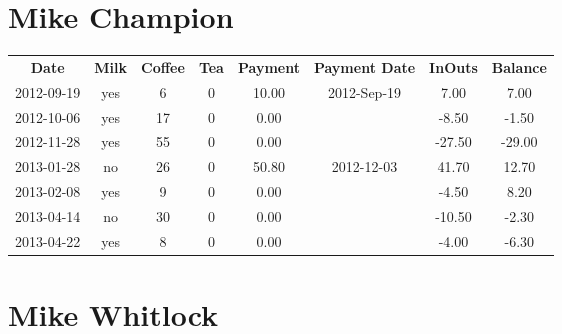 \section{Mike Champion}

\begin{center}
\begin{tabular}{cccccccc}
\textbf{Date} & \textbf{Milk} & \textbf{Coffee} & \textbf{Tea} & \textbf{Payment} & \textbf{Payment Date} & \textbf{InOuts} & \textbf{Balance} \\
2012-09-19 & yes &  6 & 0 & 10.00 & 2012-Sep-19 &   7.00 &   7.00\\ 
2012-10-06 & yes & 17 & 0 &  0.00 &  &  -8.50 &  -1.50\\ 
2012-11-28 & yes & 55 & 0 &  0.00 &  & -27.50 & -29.00\\ 
2013-01-28 & no & 26 & 0 & 50.80 & 2012-12-03 &  41.70 &  12.70\\ 
2013-02-08 & yes &  9 & 0 &  0.00 &  &  -4.50 &   8.20\\ 
2013-04-14 & no & 30 & 0 &  0.00 &  & -10.50 &  -2.30\\ 
2013-04-22 & yes &  8 & 0 &  0.00 &  &  -4.00 &  -6.30
\end{tabular}
\end{center}

\section{Mike Whitlock}

